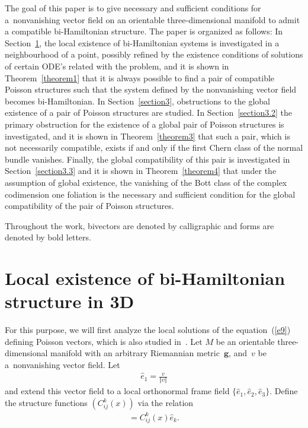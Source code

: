 \documentclass[pdftex]{sigma}
\numberwithin{equation}{section}
\begin{document}
The goal of this paper is to give necessary and suf\/f\/icient conditions for a~nonvanishing vector f\/ield on an orientable three-dimensional manifold to admit a compatible bi-Hamiltonian structure. The paper is organized as follows: In Section~\ref{section2}, the local existence of bi-Hamiltonian systems is investigated in a neighbourhood of a point, possibly ref\/ined by the existence conditions of solutions of certain ODE's related with the problem, and it is shown in Theorem~\ref{theorem1} that it is always possible to f\/ind a pair of compatible Poisson structures such that the system def\/ined by the nonvanishing vector f\/ield becomes bi-Hamiltonian. In Section~\ref{section3}, obstructions to the global existence of a pair of Poisson structures are studied. In Section~\ref{section3.2} the primary obstruction for the existence of a global pair of Poisson structures is investigated, and it is shown in Theorem~\ref{theorem3} that such a pair, which is not necessarily compatible, exists if and only if the f\/irst Chern class of the normal bundle vanishes. Finally, the global compatibility of this pair is investigated in Section~\ref{section3.3} and it is shown in Theorem~\ref{theorem4} that under the assumption of global existence, the vanishing of the Bott class of the complex codimension one foliation is the necessary and suf\/f\/icient condition for the global compatibility of the pair of Poisson structures.

Throughout the work, bivectors are denoted by calligraphic and forms are denoted by bold letters.

\section{Local existence of bi-Hamiltonian structure in 3D}\label{section2}

For this purpose, we will f\/irst analyze the local solutions of the equation~(\ref{e9}) def\/ining Poisson vectors, which is also studied in~\cite{Bermejo}. Let $M$ be an orientable three-dimensional manifold with an arbitrary Riemannian metric~$\boldsymbol{g}$, and~$v$ be a~nonvanishing vector f\/ield. Let
\begin{gather*}
\widehat{e}_{1}=\frac{v}{\Vert v \Vert }
\end{gather*}
and extend this vector f\/ield to a local orthonormal frame f\/ield $\{\widehat{e}_{1},\widehat{e}_{2},\widehat{e}_{3}\} $. Def\/ine the structure functions $(C_{ij}^{k}(x)) $ via the relation
\begin{gather}
[ \widehat{e}_{i},\widehat{e}_{j}] =C_{ij}^{k}(x) \widehat{e}_{k}. \label{e14}
\end{gather}
\end{document}
